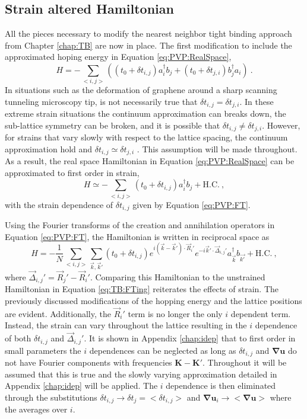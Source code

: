 \subsection{Strain altered Hamiltonian}
All the pieces necessary to modify the nearest neighbor tight binding approach from Chapter \ref{chap:TB} are now in place.
The first modification to include the approximated hoping energy in Equation \ref{eq:PVP:RealSpace},
\begin{equation*}
  H=-\sum_{<i,j>} \left( (t_0+\delta t_{i,j})  a_i^{\dagger} b_j + (t_0+\delta t_{j,i}) b_j^{\dagger} a_i \right) \ .
\end{equation*}
In situations such as the deformation of graphene around a sharp scanning tunneling microscopy tip, is not necessarily true that $\delta t_{i,j} = \delta t_{j,i}$.
In these extreme strain situations the continuum approximation can breaks down, the sub-lattice symmetry can be broken, and it is possible that $\delta t_{i,j} \neq \delta t_{j,i}$.
However, for strains that vary slowly with respect to the lattice spacing, the continuum approximation hold and $\delta t_{i,j} \simeq \delta t_{j,i}$ \cite{Sloan2013}.
This assumption will be made throughout.
As a result, the real space Hamiltonian in Equation \ref{eq:PVP:RealSpace} can be approximated to first order in strain,
\begin{equation*}
  H \simeq -\sum_{<i,j>} \left( t_0+\delta t_{i,j} \right)  a_i^{\dagger} b_j + \text{H.C.} \ ,
\end{equation*}
with the strain dependence of $\delta t_{i,j}$ given by Equation \ref{eq:PVP:FT}.

Using the Fourier transforms of the creation and annihilation operators in Equation \ref{eq:PVP:FT}, the Hamiltonian is written in reciprocal space as 
\begin{equation}
  H=-\frac{1}{N} \sum_{<i,j>} \sum_{\vec{k},\vec{k}'} \left( t_0+\delta t_{i,j} \right)
    e^{i(\vec{k}-\vec{k}')\cdot \vec{R}_i'}
    e^{-i\vec{k}'\cdot \vec{\Delta}_{i,j}'}
    a_{\vec{k}}^{\dagger} b_{\vec{k'}} +\text{H.C.}\ ,
    \label{eq:TB:beforeSV}
\end{equation}
where $\vec{\Delta}_{i,j}'=\vec{R}_j'-\vec{R}_i'$.
Comparing this Hamiltonian to the unstrained Hamiltonian in Equation \ref{eq:TB:FTing} reiterates the effects of strain.
The previously discussed modifications of the hopping energy and the lattice positions are evident.
Additionally, the $\vec{R}_i'$ term is no longer the only $i$ dependent term.
Instead, the strain can vary throughout the lattice resulting in the $i$ dependence of both $\delta t_{i,j}$ and $\vec{\Delta}_{i,j}'$.
It is shown in Appendix \ref{chap:idep} that to first order in small parameters the $i$ dependences can be neglected as long as $\delta t_{i,j}$ and $\bm{\nabla u}$ do not have Fourier components with frequencies $\bm{K}-\bm{K'}$.
Throughout it will be assumed that this is true and the slowly varying approximation detailed in Appendix \ref{chap:idep} will be applied.
The $i$ dependence is then eliminated through the substitutions $\delta t_{i,j} \rightarrow \delta t_j=<\delta t_{i,j}>$ and $\bm{\nabla u}_i \rightarrow <\bm{\nabla u}>$ where the averages over $i$. 


